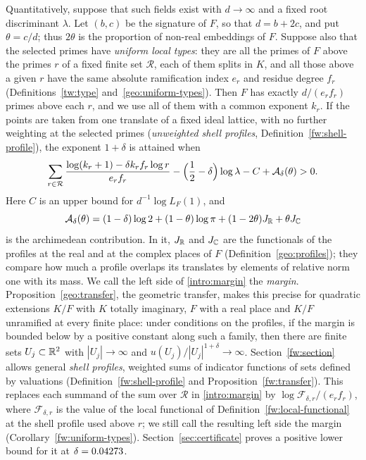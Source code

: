Quantitatively, suppose that such fields exist with $d\to\infty$ and a
fixed root discriminant $\lambda$. Let $(b,c)$ be the signature of $F$,
so that $d=b+2c$, and put $\theta=c/d$; thus $2\theta$ is the proportion
of non-real embeddings of $F$. Suppose also that the selected
primes have \emph{uniform local types}: they are all the primes of $F$
above the primes $r$ of a fixed finite set $\mathcal R$, each of them
splits in $K$, and all those above a given $r$ have the same absolute
ramification index $e_r$ and residue degree $f_r$ (Definitions~\ref{tw:type}
and~\ref{geo:uniform-types}). Then $F$ has exactly $d/(e_rf_r)$ primes
above each $r$, and we use all of them with a common exponent
$k_r$. If the points are taken from one translate
of a fixed ideal lattice, with no further weighting at the selected
primes (\emph{unweighted shell profiles},
Definition~\ref{fw:shell-profile}), the
exponent $1+\delta$ is attained when
\begin{equation}\label{intro:margin}
 \sum_{r\in\mathcal R}\frac{\log(k_r+1)-\delta k_rf_r\log r}{e_rf_r}
 -\Bigl(\frac12-\delta\Bigr)\log\lambda-C+\mathcal A_\delta(\theta)>0.
\end{equation}
Here $C$ is an upper
bound for $d^{-1}\log L_F(1)$, and
\[
 \mathcal A_\delta(\theta)=(1-\delta)\log2+(1-\theta)\log\pi
 +(1-2\theta)J_\mathbb R+\theta J_\mathbb C
\]
is the archimedean contribution. In it, $J_\mathbb R$ and $J_\mathbb C$ are the
functionals of the profiles at the real and at the complex places of
$F$ (Definition~\ref{geo:profiles}); they compare how much a profile
overlaps its translates by elements of relative norm one with its mass.
We call the left side of \eqref{intro:margin} the \emph{margin}.
Proposition~\ref{geo:transfer}, the geometric transfer, makes this
precise for quadratic extensions $K/F$ with $K$ totally imaginary, $F$
with a real place and $K/F$ unramified at every finite place: under
conditions on the profiles, if the margin is bounded below by a positive
constant along such a family, then there are finite sets
$U_j\subset\mathbb R^2$ with $|U_j|\to\infty$ and
$u(U_j)/|U_j|^{1+\delta}\to\infty$. Section~\ref{fw:section} allows
general \emph{shell profiles}, weighted sums of indicator functions of
sets defined by valuations (Definition~\ref{fw:shell-profile} and
Proposition~\ref{fw:transfer}). This replaces each summand of the sum
over $\mathcal R$ in \eqref{intro:margin} by
$\log\mathcal F_{\delta,r}/(e_rf_r)$, where $\mathcal F_{\delta,r}$ is
the value of the local functional of Definition~\ref{fw:local-functional}
at the shell profile used above $r$; we still call the resulting left
side the margin (Corollary~\ref{fw:uniform-types}).
Section~\ref{sec:certificate} proves a positive lower bound for it at
$\delta=0.04273$.

